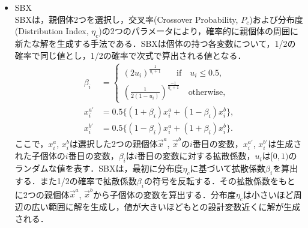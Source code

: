 \begin{itemize}
    \item SBX\cite{Agrawal95}\\
          SBXは，親個体2つを選択し，交叉率(Crossover Probability, $P_c$)および分布度(Distribution Index, $\eta_c$)の2つのパラメータにより，確率的に親個体の周囲に新たな解を生成する手法である．SBXは個体の持つ各変数について，1/2の確率で同じ値とし，1/2の確率で次式で算出される値となる．
          \begin{align}
              \beta_i  & =
              \begin{cases}
                  (2u_i)^{\frac{1}{\eta_c+1}} ~~~~~~~~ \mbox{if} \quad u_{i} \leq 0.5, \\
                  (\frac{1}{2(1-u_i)})^{\frac{-1}{\eta_c+1}} \quad \mbox{otherwise},
              \end{cases}                                  \\
              x_i^{a'} & = 0.5 \{(1+\beta_i)x_i^a + (1-\beta_i)x_i^b \}, \\
              x_i^{b'} & = 0.5 \{(1-\beta_i)x_i^a + (1+\beta_i)x_i^b \}.
          \end{align}
          ここで，$x_i^a$, $x_i^b$は選択した2つの親個体$\vec{x}^a$, $\vec{x}^b$の$i$番目の変数，$x_i^{a'}$, $x_i^{b'}$は生成された子個体の$i$番目の変数，$\beta_i$は$i$番目の変数に対する拡散係数，$u_{i}$は$[0,1)$のランダムな値を表す．SBXは，最初に分布度$\eta_c$に基づいて拡散係数$\beta_i$を算出する．また1/2の確率で拡散係数$\beta_i$の符号を反転する．その拡散係数をもとに2つの親個体$\vec{x}^a$, $\vec{x}^b$から子個体の変数を算出する．分布度$\eta_c$は小さいほど周辺の広い範囲に解を生成し，値が大きいほどもとの設計変数近くに解が生成される．


\end{itemize}
